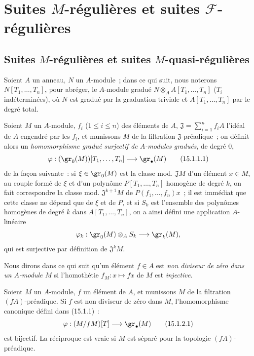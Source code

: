 \section{Suites \texorpdfstring{$M$}{M}-régulières et suites
\texorpdfstring{$\mathscr F$}{F}-régulières}
\label{section:0.15-fr}

\subsection{Suites \texorpdfstring{$M$}{M}-régulières et suites
\texorpdfstring{$M$}{M}-quasi-régulières}
\label{subsection:0.15.1-fr}
\label{0.15.1-fr}

\begin{env}[15.1.1]
\label{0.15.1.1-fr}
Soient $A$ un anneau, $N$ un $A$-module~; dans ce qui suit, nous noterons
$N[T_1,\ldots,T_n]$, pour abréger, le $A$-module gradué
$N\otimes_A A[T_1,\ldots,T_n]$ ($T_i$ indéterminées), où $N$ est gradué par la
graduation triviale et $A[T_1,\ldots,T_n]$ par le degré total.

Soient $M$ un $A$-module, $f_i$ ($1\leq i\leq n$) des éléments de $A$,
$\mathfrak{J}=\sum_{i=1}^n f_iA$ l'idéal de $A$ engendré par les $f_i$, et
munissons $M$ de la filtration $\mathfrak{J}$-préadique~; on définit alors un
\emph{homomorphisme gradué surjectif de $A$-modules gradués}, de degré $0$,
\[
  \varphi : (\gr_0(M))[T_1,\ldots,T_n]\longrightarrow\gr_\bullet(M)
  \tag{15.1.1.1}\label{0.15.1.1.1-fr}
\]
de la façon suivante~: si $\xi\in\gr_0(M)$ est la classe mod.
$\mathfrak{J}M$ d'un élément $x\in M$, au couple formé de $\xi$ et d'un
polynôme $P[T_1,\ldots,T_n]$ homogène de degré $k$, on fait correspondre la
classe mod. $\mathfrak{J}^{k+1}M$ de $P(f_1,\ldots,f_n)x$~; il est immédiat
que cette classe
ne dépend que de $\xi$ et de $P$, et si $S_k$ est l'ensemble des polynômes
homogènes de degré $k$ dans $A[T_1,\ldots,T_n]$, on a ainsi défini une
application $A$-linéaire
\[
  \varphi_k:\gr_0(M)\otimes_A S_k\longrightarrow\gr_k(M),
\]
qui est surjective par définition de $\mathfrak{J}^kM$.

Nous dirons dans ce qui suit qu'un élément $f\in A$ est \emph{non diviseur de
zéro dans un $A$-module $M$} si l'homothétie $f_M:x\mapsto fx$ de $M$ est
\emph{injective}.
\end{env}

\begin{lemma}[15.1.2]
\label{0.15.1.2-fr}
Soient $M$ un $A$-module, $f$ un élément de $A$, et munissons $M$ de la
filtration $(fA)$-préadique. Si $f$ est non diviseur de zéro dans $M$,
l'homomorphisme canonique défini dans (15.1.1)~:
\[
  \varphi:(M/fM)[T]\longrightarrow\gr_\bullet(M)
  \tag{15.1.2.1}\label{0.15.1.2.1-fr}
\]
est bijectif. La réciproque est vraie si $M$ est séparé pour la topologie
$(fA)$-préadique.
\end{lemma}

